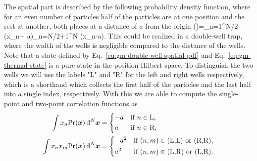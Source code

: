 The spatial part is described by the following probability density function, where for an even number of particles half of the particles are at one position and the rest at another, both places at a distance of $a$ from the origin
\be
  \prob()=\prod_{n=1}^{N/2} \delta(x_n+ a)\prod_{n=N/2+1}^{N} \delta(x_n-a).
  \label{eq:gm-double-well-spatial-pdf}
\ee
This could be realized in a double-well trap, where the width of the wells is negligible compared to the distance of the wells.
Note that a state defined by Eq.~\eqref{eq:gm-double-well-spatial-pdf} and Eq.~\eqref{eq:gm-thermal-state} is a pure state in the position Hilbert space.
To distinguish the two wells we will use the labels "L" and "R" for the left and right wells respectively, which is a shorthand which collects the first half of the particles and the last half into a single index, respectively.
With this we are able to compute the single-point and two-point correlation functions as
\begin{subequations}
  \begin{align}
    \int  x_n\text{Pr}(\boldsymbol{x})\,\text{d}^N\boldsymbol{x} &= \left\{
    \begin{aligned}
      & {-a} && \text{if }  n\in \text{L},\\
      &  a   && \text{if }  n\in \text{R},
    \end{aligned}\right.
    \label{eq:single-point-function-double-well}\\
    \int x_n x_m\text{Pr}(\boldsymbol{x})\,\text{d}^N\boldsymbol{x} &= \left\{
    \begin{aligned}
      &{-a^2} && \text{if } (n,m)\in \text{(L,L) or (R,R),}\\
      & a^2   && \text{if } (n,m)\in \text{(L,R) or (L,R).}
    \end{aligned}
    \right.
    \label{eq:two-point-function-double-well}
  \end{align}
\end{subequations}

